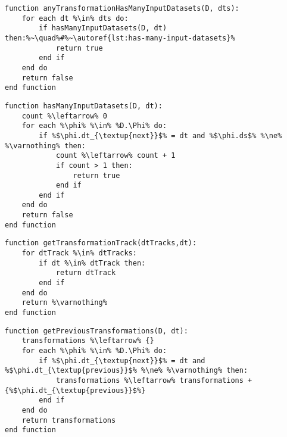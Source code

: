  \begin{lstlisting}[language=pseudocode,label={lst:any-transformation-has-many-input-datasets},caption={[Determinação de se pelo menos uma transformação possui mais de um conjunto de dados de entrada.]Determinação de se pelo menos uma transformação de dados possui mais de um conjunto de dados de entrada. Retorna verdadeiro caso positivo, e falso caso contrário.}]
function anyTransformationHasManyInputDatasets(D, dts):
    for each dt %\in% dts do:
        if hasManyInputDatasets(D, dt) then:%~\quad%#%~\autoref{lst:has-many-input-datasets}%
            return true
        end if
    end do
    return false
end function
\end{lstlisting}
 \begin{lstlisting}[language=pseudocode,label={lst:has-many-input-datasets},caption={[Contagem dos conjuntos de dados anteriores a uma transformação]Contagem dos conjuntos de dados anteriores a uma transformação de dados. Retorna verdadeiro caso essa quantidade seja maior do que um, e falso caso contrário.}]
function hasManyInputDatasets(D, dt):
    count %\leftarrow% 0
    for each %\phi% %\in% %D.\Phi% do:
        if %$\phi.dt_{\textup{next}}$% = dt and %$\phi.ds$% %\ne% %\varnothing% then:
            count %\leftarrow% count + 1
            if count > 1 then:
                return true
            end if
        end if
    end do
    return false
end function
\end{lstlisting}
 \begin{lstlisting}[language=pseudocode,label={lst:get-transformation-track},caption={[Obtenção da trilha de transformações de uma transformação.]Obtenção da trilha de transformações de uma transformação.}]
function getTransformationTrack(dtTracks,dt):
    for dtTrack %\in% dtTracks:
        if dt %\in% dtTrack then:
            return dtTrack
        end if
    end do
    return %\varnothing%
end function
\end{lstlisting}

\begin{lstlisting}[language=pseudocode,label={lst:get-previous-transformations},caption={[Obtenção das transformações de dados anteriores a uma transformação]Obtenção das transformações de dados anteriores a uma transformação de dados.}]
function getPreviousTransformations(D, dt):
    transformations %\leftarrow% {}
    for each %\phi% %\in% %D.\Phi% do:
        if %$\phi.dt_{\textup{next}}$% = dt and %$\phi.dt_{\textup{previous}}$% %\ne% %\varnothing% then:
            transformations %\leftarrow% transformations + {%$\phi.dt_{\textup{previous}}$%}
        end if
    end do
    return transformations
end function
\end{lstlisting}

